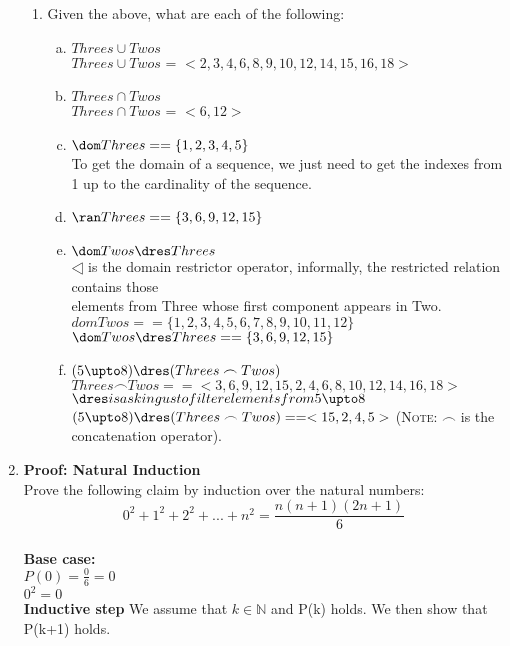\documentclass{article}
\begin{document}
\begin{enumerate}[\bf I.]
\begin{enumerate}[1.]
\item Given the above, what are each of the following:
\begin{enumerate}[a.]
\item $Threes \cup Twos$ \\
  $Threes \cup Twos$ = $<2,3,4,6,8,9,10,12,14,15,16,18 >$ \\
\item $Threes \cap Twos$ \\
  $Threes \cap Twos$ = $<6, 12>$ \\
\item $\dom Threes == \{1, 2 ,3 ,4 ,5 \}$ \\
  To get the domain of a sequence, we just need to get the indexes from 1 up to the cardinality of the sequence. \\
\item $\ran Threes == \{3 ,6 ,9 ,12 ,15\}$ \\
\item $\dom Twos \dres Threes$ \\
  $\dres$ is the domain restrictor operator, informally, the restricted relation contains those \\
  elements from Three whose first component appears in Two. \\
  $dom Twos == \{1,2,3,4,5,6,7,8,9,10,11,12\}$\\
  $\dom Twos \dres Threes == \{3, 6, 9, 12, 15\}$\\
\item $(5 \upto 8)\dres (Threes \frown Twos)$\\
  $Threes \frown Twos == <3,6,9,12,15,2,4,6,8,10,12,14,16,18>$
  $\dres is asking us to filter elements from 5 \upto 8$ \\
  $(5 \upto 8)\dres (Threes \frown Twos) == <15,2,4,5>$
(\textsc{Note}: $\frown$ is the concatenation operator).
\end{enumerate}
\end{enumerate}


\item \textbf{Proof: Natural Induction} \\[8pt]
Prove the following claim by induction over the natural numbers:
\[\displaystyle 0^2 + 1^2 + 2^2 + ... + n^2 = \frac{n( n + 1 )( 2n + 1 )}{6}\] \\
\textbf{Base case:}\\
$P(0) = \frac{0} {6} = 0 $ \\
$0^2 = 0$ \\
\textbf{Inductive step} We assume that $k \in \mathbb{N}$ and P(k) holds. We then show that P(k+1) holds.



\end{enumerate}
\end{document}
